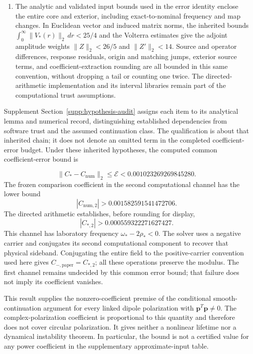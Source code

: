 \begin{enumerate}
\item The analytic and validated input bounds used in the error identity
enclose the entire core and exterior, including exact-to-nominal
frequency and map changes. In Euclidean vector and induced matrix norms,
the inherited bounds
$\int_0^\infty\|V_*(r)\|_2\,dr<25/4$ and the Volterra estimates give
the adjoint amplitude weights $\|Z\|_2<26/5$ and $\|Z'\|_2<14$.
Source and operator differences, response residuals, origin and matching
jumps, exterior source terms, and coefficient-extraction rounding are
all bounded in this same convention, without dropping a tail or counting
one twice. The directed-arithmetic implementation and its interval
libraries remain part of the computational trust assumptions.
\end{enumerate}
Supplement Section~\ref{supp:hypothesis-audit} assigns each item to its
analytical lemma and numerical record, distinguishing established
dependencies from software trust and the assumed continuation class.
The qualification is about that inherited chain; it does not denote
an omitted term in the completed coefficient-error budget.
Under these inherited hypotheses, the computed common coefficient-error
bound is

\begin{equation}
 \|C_* - C_{\mathrm{num}}\|_2
 \leq \mathcal E < 0.001023269269845280.
\end{equation}
The frozen comparison coefficient in the second computational channel
has the lower bound
\begin{equation}
 |C_{\mathrm{num},2}| > 0.001582591541472706.
\end{equation}
The directed arithmetic establishes, before rounding for display,
\begin{equation}
 |C_{*,2}| > 0.000559322271627427.
\end{equation}
This channel has laboratory frequency $\omega_*-2\rho_*<0$.
The solver uses a negative carrier and conjugates its second computational
component to recover that physical sideband. Conjugating the entire field
to the positive-carrier convention used here gives
$C_{-,\mathrm{paper}}=C_{*,2}$; all these operations preserve the modulus.
The first channel remains undecided by this common error bound; that
failure does not imply its coefficient vanishes.

This result supplies the nonzero-coefficient premise of the conditional
smooth-continuation argument for every linked dipole polarization with
$\boldsymbol p^T\boldsymbol p\ne0$. The complex-polarization coefficient
is proportional to this quantity and therefore does not cover circular
polarization. It gives neither a nonlinear lifetime nor a dynamical
instability theorem. In particular, the bound is not a certified value
for any power coefficient in the supplementary approximate-input table.
